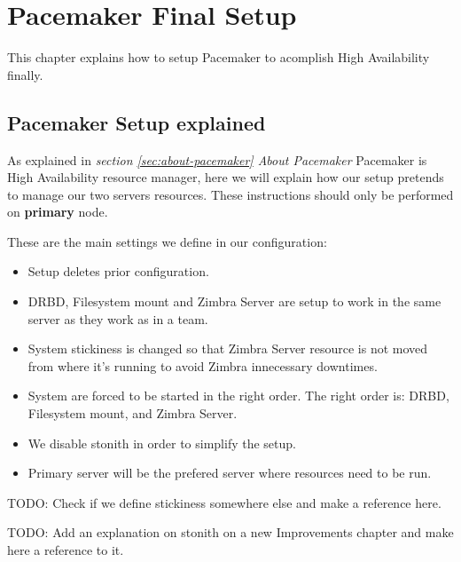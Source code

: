 

\chapter{Pacemaker Final Setup}
\label{chap:pacemaker-final-setup}
This chapter explains how to setup Pacemaker to acomplish High Availability finally.

\section {Pacemaker Setup explained}
As explained in \textit{section \ref{sec:about-pacemaker} About Pacemaker} Pacemaker is High Availability resource manager, here we will explain how our setup pretends to manage our two servers resources. These instructions should only be performed on \textbf{primary} node.

These are the main settings we define in our configuration:
\begin{itemize}
  \item Setup deletes prior configuration.
  \item DRBD, Filesystem mount and Zimbra Server are setup to work in the same server as they work as in a team.
  \item System stickiness is changed so that Zimbra Server resource is not moved from where it's running to avoid Zimbra innecessary downtimes.
  \item System are forced to be started in the right order. The right order is: DRBD, Filesystem mount, and Zimbra Server.
  \item We disable stonith in order to simplify the setup.
  \item Primary server will be the prefered server where resources need to be run.
\end{itemize}

TODO: Check if we define stickiness somewhere else and make a reference here.

TODO: Add an explanation on stonith on a new Improvements chapter and make here a reference to it.


